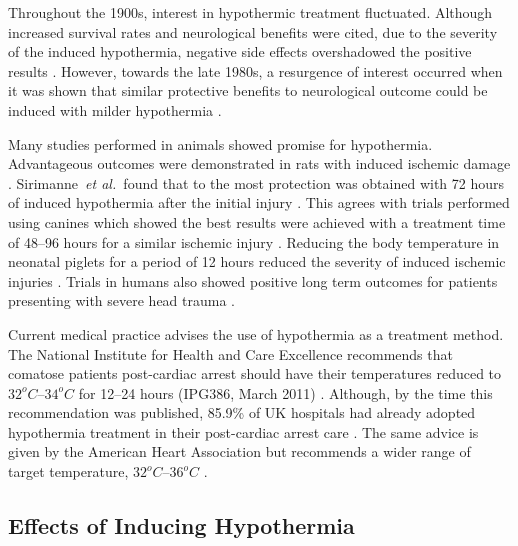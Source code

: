 \documentclass[11pt,english,a4paper,twoside,openright]{report}
\begin{document}
{{{{{{{{	Throughout the 1900s, interest in hypothermic treatment fluctuated. Although increased survival rates and neurological benefits were cited, due to the severity of the induced hypothermia, negative side effects overshadowed the positive results \cite{karnatovskaia2014therapeutic}. However, towards the late 1980s, a resurgence of interest occurred when it was shown that similar protective benefits to neurological outcome could be induced with milder hypothermia \cite{gilston1985another}. 
	
	Many studies performed in animals showed promise for hypothermia. Advantageous outcomes were demonstrated in rats with induced ischemic damage \cite{busto1987small}\cite{thoresen1996posthypoxic}. Sirimanne~\textit{et al.\ }found that to the most protection was obtained with 72 hours of induced hypothermia after the initial injury \cite{sirimanne1996effect}. This agrees with trials performed using canines which showed the best results were achieved with a treatment time of 48--96 hours for a similar ischemic injury \cite{leonov1990moderate}. Reducing the body temperature in neonatal piglets for a period of 12 hours reduced the severity of induced ischemic injuries \cite{thoresen1995mild}\cite{amess1997mild}. Trials in humans also showed positive long term outcomes for patients presenting with severe head trauma \cite{marion1993use}\cite{marion1997treatment}.
	
	Current medical practice advises the use of hypothermia as a treatment method. The National Institute for Health and Care Excellence recommends that comatose patients post-cardiac arrest should have their temperatures reduced to $32^{o}C$--$34^{o}C$ for 12--24 hours (IPG386, March 2011) \cite{nice2011therapeutic}. Although, by the time this recommendation was published, 85.9\% of UK hospitals had already adopted hypothermia treatment in their post-cardiac arrest care \cite{binks2010therapeutic}. The same advice is given by the American Heart Association but recommends a wider range of target temperature, $32^{o}C$--$36^{o}C$ \cite{neumar2015part}.
	
	\subsection{Effects of Inducing Hypothermia}
	
}}}}}}}}
\end{document}
